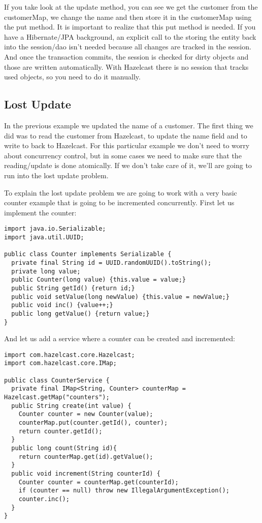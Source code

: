 If you take look at the update method, you can see we get the customer from the customerMap, we change the name and then store it in the customerMap using the put method. It is important to realize that this put method is needed. If you have a Hibernate/JPA background, an explicit call to the storing the entity back into the session/dao isn't needed because all changes are tracked in the session. And once the transaction commits, the session is checked for dirty objects and those are written automatically. With Hazelcast there is no session that tracks used objects, so you need to do it manually. 

\subsection{Lost Update}

In the previous example we updated the name of a customer. The first thing we did was to read the customer from Hazelcast, to update the name field and to write to back to Hazelcast. For this particular example we don't need to worry about concurrency control, but in some cases we need to make sure that the reading/update is done atomically. If we don't take care of it, we'll are going to run into the lost update problem.

To explain the lost update problem we are going to work with a very basic counter example that is
going to be incremented concurrently. First let us implement the counter:

\begin{verbatim}
import java.io.Serializable;
import java.util.UUID;

public class Counter implements Serializable {
  private final String id = UUID.randomUUID().toString();
  private long value;
  public Counter(long value) {this.value = value;}
  public String getId() {return id;}
  public void setValue(long newValue) {this.value = newValue;}
  public void inc() {value++;}
  public long getValue() {return value;}
}
\end{verbatim}

And let us add a service where a counter can be created and incremented:

\begin{verbatim}
import com.hazelcast.core.Hazelcast;
import com.hazelcast.core.IMap;

public class CounterService {
  private final IMap<String, Counter> counterMap = Hazelcast.getMap("counters");
  public String create(int value) {
    Counter counter = new Counter(value);
    counterMap.put(counter.getId(), counter);
    return counter.getId();
  }
  public long count(String id){
    return counterMap.get(id).getValue();
  }
  public void increment(String counterId) {
    Counter counter = counterMap.get(counterId);
    if (counter == null) throw new IllegalArgumentException();
    counter.inc();
  }
}
\end{verbatim}


